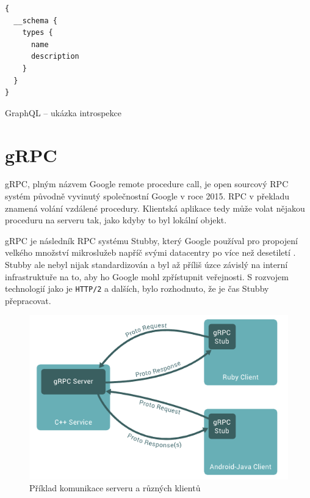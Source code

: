 \documentclass[thesis=M,czech]{FITthesis}[2019/12/23]
\begin{document}
\begin{listing}[H]
\begin{verbatim}
{
  __schema {
    types {
      name
      description 
    }
  }
}
\end{verbatim}
\caption{GraphQL -- ukázka introspekce}
\label{lst:graphql_introspection}
\end{listing}

\section{gRPC}
gRPC, plným názvem Google remote procedure call, je open sourcový RPC systém původně vyvinutý společnostní Google v roce 2015. RPC v překladu znamená volání vzdálené procedury. Klientská aplikace tedy může volat nějakou proceduru na serveru tak, jako kdyby to byl lokální objekt.

gRPC je následník RPC systému Stubby, který Google používal pro propojení velkého množství mikroslužeb napříč svými datacentry po více než desetiletí \cite{grpc}. Stubby ale nebyl nijak standardizován a byl až příliš úzce závislý na interní infrastruktuře na to, aby ho Google mohl zpřístupnit veřejnosti. S rozvojem technologií jako je \texttt{HTTP/2} a dalších, bylo rozhodnuto, že je čas Stubby přepracovat.

\begin{figure}[H]
    \includegraphics[width=\linewidth]{img/grpc-overview.png}
    \caption{Příklad komunikace serveru a různých klientů}
	\label{grpc-overview}
\end{figure}
\end{document}
